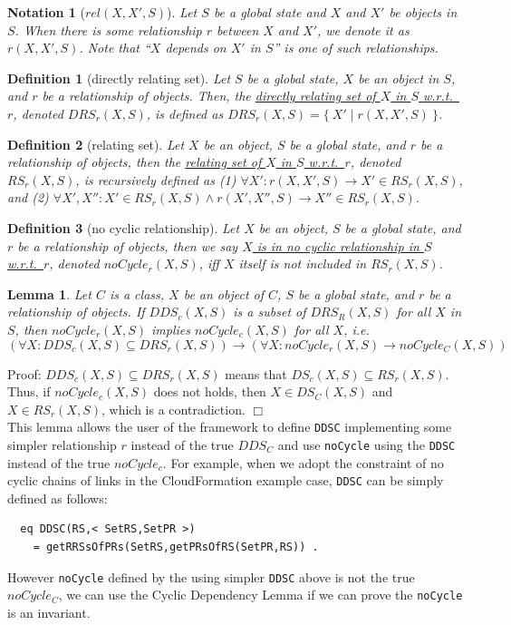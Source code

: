 \documentclass[12pt]{report}
\newtheorem{lemma}{Lemma}
\newtheorem{notation}{Notation}
\newtheorem{definition}{Definition}
\newcommand{\ra}{\rightarrow}
\newcommand{\ul}{\underline}
\begin{document}
\begin{notation}[$rel(X,X',S)$]
  Let $S$ be a global state and $X$ and $X'$ be objects in $S$.  When
  there is some relationship $r$ between $X$ and $X'$, we denote it
  as \ul{$r(X,X',S)$}. Note that ``$X$ depends on $X'$ in $S$'' is one
  of such relationships.
\end{notation}

\begin{definition}[directly relating set]
Let $S$ be a global state, $X$ be an object in $S$, and $r$ be a
relationship of objects. Then, the \ul{directly relating set of $X$ in
  $S$ w.r.t.\ $r$}, denoted \ul{$DRS_r(X,S)$}, is defined as
$DRS_r(X,S)=\{~X'\mid r(X,X',S)~\}$.
\end{definition}

\begin{definition}[relating set]
Let $X$ be an object, $S$ be a global state, and $r$ be a relationship
of objects, then the \ul{relating set of $X$ in $S$
  w.r.t.\ $r$}, denoted \ul{$RS_r(X,S)$}, is recursively defined
as (1) $\forall X': r(X,X',S) \ra X'\in RS_r(X,S)$, and (2)
$\forall X',X'':X'\in RS_r(X,S) \land r(X',X'',S) \ra X''\in
RS_r(X,S)$.
\end{definition}

\begin{definition}[no cyclic relationship]
Let $X$ be an object, $S$ be a global state, and $r$ be a relationship
of objects, then we say \ul{$X$ is in no cyclic relationship in $S$
  w.r.t.\ $r$}, denoted \ul{$noCycle_r(X,S)$}, iff $X$ itself is not
included in $RS_r(X,S)$.
\end{definition}

\begin{lemma}
Let $C$ is a class, $X$ be an object of $C$, $S$ be a global state,
and $r$ be a relationship of objects. If $DDS_c(X,S)$ is a subset of
$DRS_R(X,S)$ for all $X$ in $S$, then $noCycle_r(X,S)$ implies
$noCycle_c(X,S)$ for all $X$, i.e.
\[(\forall X:DDS_c(X,S)\subseteq DRS_r(X,S)) \ra (\forall X:noCycle_r(X,S) \ra
noCycle_C(X,S))\]
\end{lemma}
Proof: $DDS_c(X,S)\subseteq DRS_r(X,S)$ means that $DS_c(X,S)\subseteq
RS_r(X,S)$.  Thus, if $noCycle_c(X,S)$ does not holds, then $X\in
DS_C(X,S)$ and $X\in RS_r(X,S)$, which is a contradiction. $\Box$\\

This lemma allows the user of the framework to define {\tt DDSC}
implementing some simpler relationship $r$ instead of the true $DDS_C$
and use {\tt noCycle} using the {\tt DDSC} instead of the true
$noCycle_c$. For example, when we adopt the constraint of no cyclic
chains of links in the CloudFormation example case, {\tt DDSC} can be
simply defined as follows:
\begin{verbatim}
  eq DDSC(RS,< SetRS,SetPR >)
    = getRRSsOfPRs(SetRS,getPRsOfRS(SetPR,RS)) .
\end{verbatim}
However {\tt noCycle} defined by the using simpler {\tt DDSC} above is
 not the true $noCycle_C$, we can use the Cyclic Dependency Lemma if
 we can prove the {\tt noCycle} is an invariant.
\end{document}
